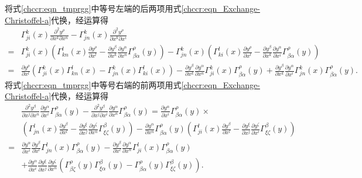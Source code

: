 将式\eqref{chccr:eqn_tmprgg}中等号左端的后两项用式\eqref{chccr:eqn_Exchange-Christoffel-a}代换，经运算得
\begin{align*}
    &\Gamma^{k}_{ji}(x) \frac{\partial^2 y^\rho}{\partial x^k\partial x^n}
    -\Gamma^{k}_{jn}(x) \frac{\partial^2 y^\rho}{\partial x^k\partial x^i} \\
    =& \Gamma^{k}_{ji}(x) \left(\Gamma^{l}_{kn}(x) \frac{\partial y^\rho}{\partial x^l} -
    \frac{\partial y^\beta}{\partial x^k} \frac{\partial y^\alpha}{\partial x^n}
    \Gamma^{\rho}_{\beta\alpha}(y)\right)
    -\Gamma^{k}_{jn}(x) \left(\Gamma^{l}_{ki}(x) \frac{\partial y^\rho}{\partial x^l} -
    \frac{\partial y^\beta}{\partial x^k} \frac{\partial y^\alpha}{\partial x^i}
    \Gamma^{\rho}_{\beta\alpha}(y)\right) \\
    =& \frac{\partial y^\rho}{\partial x^l} \left(\Gamma^{k}_{ji}(x)\Gamma^{l}_{kn}(x)
     - \Gamma^{k}_{jn}(x) \Gamma^{l}_{ki}(x) \right)
     - \frac{\partial y^\beta}{\partial x^k} \frac{\partial y^\alpha}{\partial x^n}
       \Gamma^{k}_{ji}(x) \Gamma^{\rho}_{\beta\alpha}(y)
     + \frac{\partial y^\beta}{\partial x^k} \frac{\partial y^\alpha}{\partial x^i}
       \Gamma^{k}_{jn}(x)\Gamma^{\rho}_{\beta\alpha}(y) .
\end{align*} %
将式\eqref{chccr:eqn_tmprgg}中等号右端的前两项用式\eqref{chccr:eqn_Exchange-Christoffel-a}代换，经运算得
\begin{align*}
    &\frac{\partial^2 y^\beta}{\partial x^j\partial x^n}
    \frac{\partial y^\alpha}{\partial x^i} \Gamma^{\rho}_{\beta\alpha}(y)
    -  \frac{\partial^2 y^\beta}{\partial x^j\partial x^i}
    \frac{\partial y^\alpha}{\partial x^n} \Gamma^{\rho}_{\beta\alpha}(y)
    =\frac{\partial y^\alpha}{\partial x^i}\Gamma^{\rho}_{\beta\alpha}(y) \times \\
    &\left(\Gamma^{l}_{jn}(x) \frac{\partial y^\beta}{\partial x^l} -
      \frac{\partial y^\xi}{\partial x^j} \frac{\partial y^\zeta}{\partial x^n}
      \Gamma^{\beta}_{\xi\zeta}(y) \right)
    -\frac{\partial y^\alpha}{\partial x^n}\Gamma^{\rho}_{\beta\alpha}(y)
     \left(\Gamma^{l}_{ji}(x) \frac{\partial y^\beta}{\partial x^l} -
     \frac{\partial y^\xi}{\partial x^j} \frac{\partial y^\zeta}{\partial x^i}
     \Gamma^{\beta}_{\xi\zeta}(y) \right) \\
     =& \frac{\partial y^\alpha}{\partial x^i} \frac{\partial y^\beta}{\partial x^l}
        \Gamma^{l}_{jn}(x)\Gamma^{\rho}_{\beta\alpha}(y)
      - \frac{\partial y^\beta}{\partial x^l}\frac{\partial y^\alpha}{\partial x^n}
        \Gamma^{l}_{ji}(x) \Gamma^{\rho}_{\beta\alpha}(y) \\
      & +  \frac{\partial y^\alpha}{\partial x^i}
      \frac{\partial y^\xi}{\partial x^j}  \frac{\partial y^\zeta}{\partial x^n}
      \left(\Gamma^{\rho}_{\beta\zeta}(y) \Gamma^{\beta}_{\xi\alpha}(y)
      -\Gamma^{\rho}_{\beta\alpha}(y) \Gamma^{\beta}_{\xi\zeta}(y)\right) .
\end{align*}
